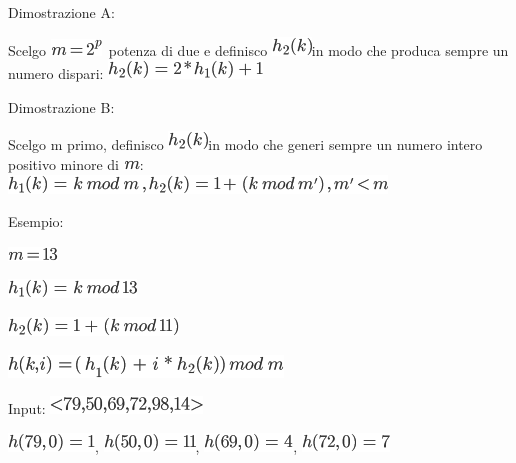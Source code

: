 \documentclass{article}
\begin{document}
{Dimostrazione A}{:}

{Scelgo }\includegraphics{images/image303.png}{~potenza di due e
definisco }\includegraphics{images/image299.png}{in modo che produca
sempre un numero dispari: }\includegraphics{images/image304.png}

{Dimostrazione B}{:}

{Scelgo m primo, definisco }\includegraphics{images/image299.png}{in
modo che generi sempre un numero intero positivo minore di
}\includegraphics{images/image235.png}{:
}\includegraphics{images/image305.png}

{Esempio:}

\includegraphics{images/image306.png}

\includegraphics{images/image307.png}

\includegraphics{images/image308.png}

\includegraphics{images/image309.png}{~}

{}

{Input: }\includegraphics{images/image310.png}

{}

\includegraphics{images/image311.png}{,
}\includegraphics{images/image312.png}{,
}\includegraphics{images/image313.png}{,
}\includegraphics{images/image314.png}
\end{document}
